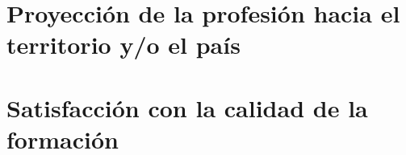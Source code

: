\section{Proyección de la profesión hacia el territorio y/o el país}



\section{Satisfacción con la calidad de la formación}

